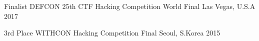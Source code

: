 


\begin{cvhonors}

  \cvhonor 
    {Finalist} %
    {DEFCON 25th CTF Hacking Competition World Final} %
    {Las Vegas, U.S.A} %
    {2017} %

\end{cvhonors}



\begin{cvhonors}

  \cvhonor
    {3rd Place} %
    {WITHCON Hacking Competition Final} %
    {Seoul, S.Korea} %
    {2015} %

\end{cvhonors}
